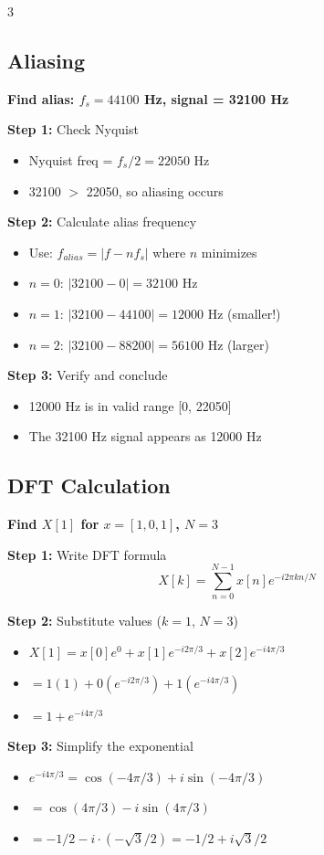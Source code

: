 \documentclass[10pt,landscape,a4paper]{article}
\newcommand{\problem}[1]{\textbf{\colorbox{cyan!15}{#1}}}
\newcommand{\answer}[1]{\colorbox{green!15}{#1}}
\begin{document}
\begin{multicols}{3}
\subsection*{Aliasing}

\problem{Find alias: $f_s = 44100$ Hz, signal = 32100 Hz}

\textbf{Step 1:} Check Nyquist
\begin{itemize}
\item Nyquist freq = $f_s/2 = 22050$ Hz
\item 32100 $>$ 22050, so aliasing occurs
\end{itemize}

\textbf{Step 2:} Calculate alias frequency
\begin{itemize}
\item Use: $f_{alias} = |f - nf_s|$ where $n$ minimizes
\item $n=0$: $|32100 - 0| = 32100$ Hz
\item $n=1$: $|32100 - 44100| = 12000$ Hz (smaller!)
\item $n=2$: $|32100 - 88200| = 56100$ Hz (larger)
\end{itemize}

\textbf{Step 3:} Verify and conclude
\begin{itemize}
\item 12000 Hz is in valid range [0, 22050]
\item The 32100 Hz signal appears as \answer{12000 Hz}
\end{itemize}

\subsection*{DFT Calculation}

\problem{Find $X[1]$ for $x = [1, 0, 1]$, $N=3$}

\textbf{Step 1:} Write DFT formula
$$X[k] = \sum_{n=0}^{N-1} x[n]e^{-i2\pi kn/N}$$

\textbf{Step 2:} Substitute values ($k=1$, $N=3$)
\begin{itemize}
\item $X[1] = x[0]e^0 + x[1]e^{-i2\pi/3} + x[2]e^{-i4\pi/3}$
\item $= 1(1) + 0(e^{-i2\pi/3}) + 1(e^{-i4\pi/3})$
\item $= 1 + e^{-i4\pi/3}$
\end{itemize}

\textbf{Step 3:} Simplify the exponential
\begin{itemize}
\item $e^{-i4\pi/3} = \cos(-4\pi/3) + i\sin(-4\pi/3)$
\item $= \cos(4\pi/3) - i\sin(4\pi/3)$
\item $= -1/2 - i\cdot(-\sqrt{3}/2) = -1/2 + i\sqrt{3}/2$
\end{itemize}


\end{multicols}
\end{document}
